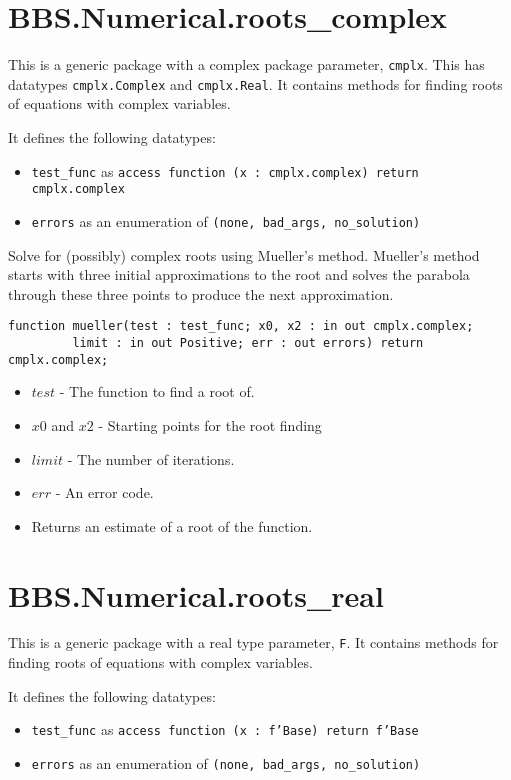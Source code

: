\documentclass[10pt, openany]{book}
\newcommand{\datatype}[1]{\texttt{#1}}
\begin{document}
\section{BBS.Numerical.roots\_complex}
This is a generic package with a complex package parameter, \datatype{cmplx}.  This has datatypes \datatype{cmplx.Complex} and \datatype{cmplx.Real}.  It contains methods for finding roots of equations with complex variables.

It defines the following datatypes:
\begin{itemize}
   \item \datatype{test\_func} as \datatype{access function (x : cmplx.complex) return cmplx.complex}
   \item \datatype{errors} as an enumeration of \datatype{(none, bad\_args, no\_solution)}
\end{itemize}

Solve for (possibly) complex roots using Mueller's method.  Mueller's method starts with three initial approximations to the root and solves the parabola through these three points to produce the next approximation.
\begin{lstlisting}
function mueller(test : test_func; x0, x2 : in out cmplx.complex;
         limit : in out Positive; err : out errors) return cmplx.complex;
\end{lstlisting}
\begin{itemize}
  \item $test$ - The function to find a root of.
  \item $x0$ and $x2$ - Starting points for the root finding
  \item $limit$ - The number of iterations.
  \item $err$ - An error code.
  \item Returns an estimate of a root of the function.
\end{itemize}

\section{BBS.Numerical.roots\_real}
This is a generic package with a real type parameter, \datatype{F}.  It contains methods for finding roots of equations with complex variables.

It defines the following datatypes:
\begin{itemize}
   \item \datatype{test\_func} as \datatype{access function (x : f'Base) return f'Base}
   \item \datatype{errors} as an enumeration of \datatype{(none, bad\_args, no\_solution)}
\end{itemize}
\end{document}
